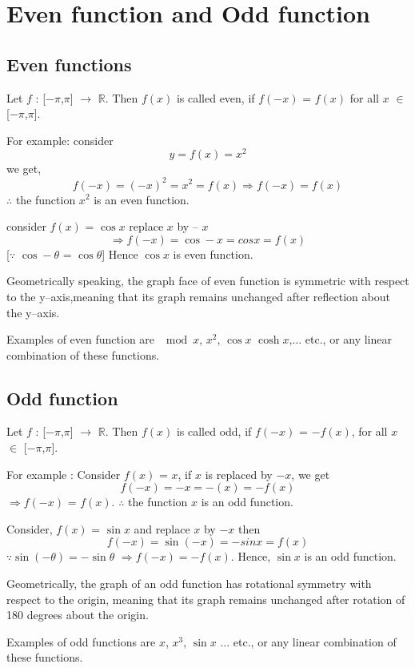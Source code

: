\documentclass[a4paper,12pt,twoside]{report}
\begin{document}
\section{Even function and Odd function}
\subsection{Even functions}
Let $f$ : [$-\pi$,$\pi$] $\to$ $\mathbb{R}$.  Then $f(x)$ is called even, if $f(-x)$ = $f(x)$ for all $x$ $\in$ [$-\pi$,$\pi$]. 

For example: consider  \[
                        y = f(x) = x^2
                       \]
we get, \[
         f(-x) = (-x)^2 = x^2 = f(x)
         \Longrightarrow f(-x) = f(x)   
        \]   $\therefore$	the function $x^2$ is an even function.
        
consider $f(x)$ = $\cos x$ replace $x$ by -- $x$ \[\Longrightarrow f(-x) = \cos -x = cos x = f(x)\][$\because$	$\cos -\theta$ = $\cos \theta$]
Hence $\cos x$ is even function.

Geometrically speaking, the graph face of even function is symmetric with respect to the y--axis,meaning that its graph remains unchanged after reflection about the y--axis.

Examples of even function are $\mod x$, $x^2$, $\cos x$ $\cosh x$,$\dots$ etc., or any linear combination of these functions.

\subsection{Odd function}
 Let $f$ : [$-\pi$,$\pi$] $\to$ $\mathbb{R}$.  Then $f(x)$ is called odd, if $f(-x)$ = $-f(x)$, for all $x$ $\in$ [$-\pi$,$\pi$].
 
For example : Consider $f(x)$ = $x$, if $x$ is replaced by $-x$, we get
\[f(-x) = -x = -(x) = -f(x)\]
$\Longrightarrow f(-x)$ = $f(x)$.  $\therefore$ the function $x$ is an odd function.  

Consider, $f(x)$ = $\sin x$ and replace $x$ by $-x$ then
\[f(-x) = \sin(-x) = - sinx = f(x)\]
$\because \sin(-\theta) = - \sin \theta$
$\Longrightarrow f(-x) = -f(x)$.  Hence, $\sin x$ is an odd function.

Geometrically, the graph of an odd function has rotational symmetry with respect to the origin, meaning that its graph remains unchanged after rotation of 180 degrees about the origin.

Examples of odd functions are $x$, $x^3$, $\sin x$ $\dots$ etc., or any linear combination of these functions.
\end{document}
